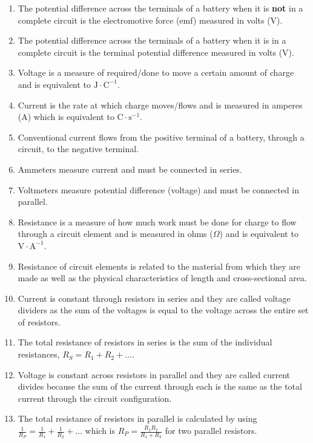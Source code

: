 \nopagebreak
\label{m38781*id201947}\begin{enumerate}[noitemsep, label=\textbf{\arabic*}. ] 
\item The potential difference across the terminals of a battery when it is \textbf{not} in a complete circuit is the electromotive force (emf) measured in volts (V).
\item The potential difference across the terminals of a battery when it is in a complete circuit is the terminal potential difference measured in volts (V).
\item Voltage is a measure of required/done to move a certain amount of charge and is equivalent to $\text{J}\cdot\text{C}^{-1}$.
\item Current is the rate at which charge moves/flows and is measured in amperes (A) which is equivalent to $\text{C}\cdot\text{s}^{-1}$.
\item Conventional current flows from the positive terminal of a battery, through a circuit, to the negative terminal.
\item Ammeters measure current and must be connected in series.
\item Voltmeters measure potential difference (voltage) and must be connected in parallel.
\item Resistance is a measure of how much work must be done for charge to flow through a circuit element and is measured in ohms ($\Omega$) and is equivalent to $\text{V}\cdot\text{A}^{-1}$.
\item Resistance of circuit elements is related to the material from which they are made as well as the physical characteristics of length and cross-sectional area.
\item Current is constant through resistors in series and they are called voltage dividers as the sum of the voltages is equal to the voltage across the entire set of resistors.
\item The total resistance of resistors in series is the sum of the individual resistances, $R_S=R_1+R_2+\ldots$.
\item Voltage is constant across resistors in parallel and they are called current divides because the sum of the current through each is the same as the total current through the circuit configuration.
\item The total resistance of resistors in parallel is calculated by using $\frac{1}{R_P}=\frac{1}{R_1}+\frac{1}{R_2}+\ldots$ which is $R_P=\frac{R_1R_2}{R_1+R_2}$ for two parallel resistors.
\end{enumerate}

